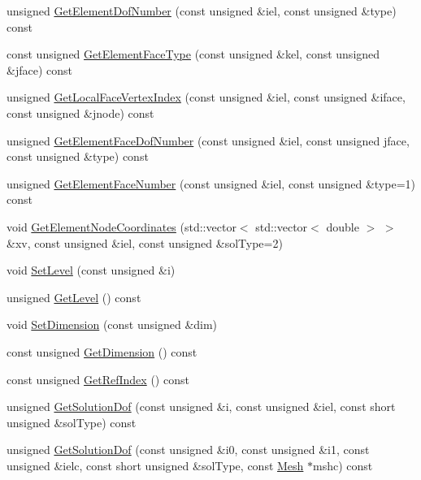 \begin{DoxyCompactItemize}
\item 
unsigned \mbox{\hyperlink{classfemus_1_1_mesh_a679fa1625833f437ea38d2cc651c7462}{Get\+Element\+Dof\+Number}} (const unsigned \&iel, const unsigned \&type) const
\item 
const unsigned \mbox{\hyperlink{classfemus_1_1_mesh_a57f92951660269429cc7f04ee3c26c17}{Get\+Element\+Face\+Type}} (const unsigned \&kel, const unsigned \&jface) const
\item 
unsigned \mbox{\hyperlink{classfemus_1_1_mesh_ad18fca5dab8c3567b644996e682043d3}{Get\+Local\+Face\+Vertex\+Index}} (const unsigned \&iel, const unsigned \&iface, const unsigned \&jnode) const
\item 
unsigned \mbox{\hyperlink{classfemus_1_1_mesh_af372596998e5d55a1fa15d6c5f58f52b}{Get\+Element\+Face\+Dof\+Number}} (const unsigned \&iel, const unsigned jface, const unsigned \&type) const
\item 
unsigned \mbox{\hyperlink{classfemus_1_1_mesh_a5a0c1124aca095fd4327252ebac3660f}{Get\+Element\+Face\+Number}} (const unsigned \&iel, const unsigned \&type=1) const
\item 
void \mbox{\hyperlink{classfemus_1_1_mesh_a5ecff0973c93b7acc768939d22827627}{Get\+Element\+Node\+Coordinates}} (std\+::vector$<$ std\+::vector$<$ double $>$ $>$ \&xv, const unsigned \&iel, const unsigned \&sol\+Type=2)
\item 
void \mbox{\hyperlink{classfemus_1_1_mesh_ad6dbe08b8fc0ba0b6f8e45c47a911ee8}{Set\+Level}} (const unsigned \&i)
\item 
unsigned \mbox{\hyperlink{classfemus_1_1_mesh_a24f5ab73a260d61b0ea9ff28f03bc815}{Get\+Level}} () const
\item 
void \mbox{\hyperlink{classfemus_1_1_mesh_a161539f93964fec14700ae553088a654}{Set\+Dimension}} (const unsigned \&dim)
\item 
const unsigned \mbox{\hyperlink{classfemus_1_1_mesh_a6f753fa456d2313d902bf184c4bb9e3b}{Get\+Dimension}} () const
\item 
const unsigned \mbox{\hyperlink{classfemus_1_1_mesh_a488d6e2380e12d1c77e3bc88bb5b5810}{Get\+Ref\+Index}} () const
\item 
unsigned \mbox{\hyperlink{classfemus_1_1_mesh_ace44edec2dc2ffb42c0456f03fa227ff}{Get\+Solution\+Dof}} (const unsigned \&i, const unsigned \&iel, const short unsigned \&sol\+Type) const
\item 
unsigned \mbox{\hyperlink{classfemus_1_1_mesh_aac0b33172ecf115925d50d42924d68ac}{Get\+Solution\+Dof}} (const unsigned \&i0, const unsigned \&i1, const unsigned \&ielc, const short unsigned \&sol\+Type, const \mbox{\hyperlink{classfemus_1_1_mesh}{Mesh}} $\ast$mshc) const

\end{DoxyCompactItemize}
